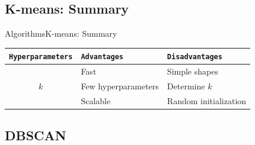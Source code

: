 \documentclass[10pt,compress]{beamer} %
\begin{document}
\subsection{K-means: Summary}
\begin{frame}[fragile]{Algorithms}{K-means: Summary}
	\begin{center}
	\begin{tabular}{cll}\hline
	 	\texttt{Hyperparameters}  & \texttt{Advantages}  & \texttt{Disadvantages} \\\hline
	 	                 & Fast                 & Simple shapes \\
	    $k$	             & Few hyperparameters  & Determine $k$ \\
	 	                 & Scalable             & Random initialization \\
	 	\hline
	\end{tabular}
	\end{center}
\end{frame}

\subsection{DBSCAN}
\end{document}
